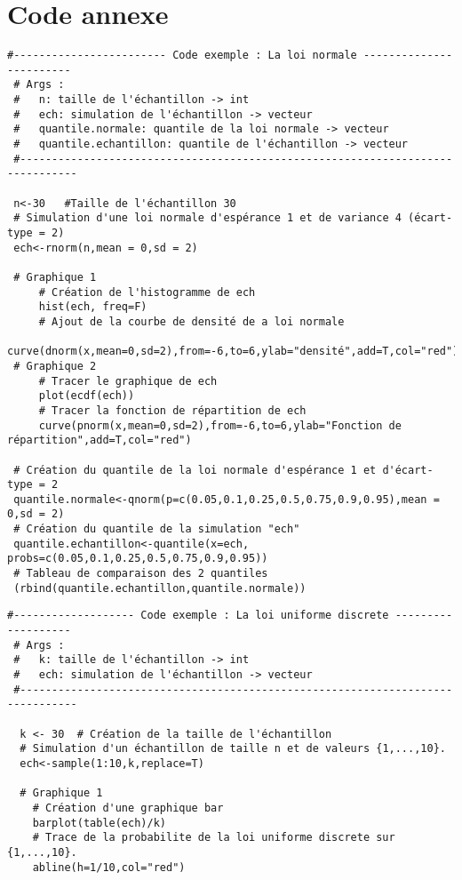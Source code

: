 \section*{Code annexe}

\begin{lstlisting}[caption=Code exemple : La loi normale, label=lst:normal_distribution]  
 #------------------------ Code exemple : La loi normale ------------------------
 # Args :
 #   n: taille de l'échantillon -> int
 #   ech: simulation de l'échantillon -> vecteur
 #   quantile.normale: quantile de la loi normale -> vecteur
 #   quantile.echantillon: quantile de l'échantillon -> vecteur
 #-------------------------------------------------------------------------------

 n<-30   #Taille de l'échantillon 30
 # Simulation d'une loi normale d'espérance 1 et de variance 4 (écart-type = 2)
 ech<-rnorm(n,mean = 0,sd = 2)

 # Graphique 1
     # Création de l'histogramme de ech
     hist(ech, freq=F)
     # Ajout de la courbe de densité de a loi normale
     curve(dnorm(x,mean=0,sd=2),from=-6,to=6,ylab="densité",add=T,col="red")
 # Graphique 2
     # Tracer le graphique de ech
     plot(ecdf(ech))
     # Tracer la fonction de répartition de ech
     curve(pnorm(x,mean=0,sd=2),from=-6,to=6,ylab="Fonction de répartition",add=T,col="red")

 # Création du quantile de la loi normale d'espérance 1 et d'écart-type = 2
 quantile.normale<-qnorm(p=c(0.05,0.1,0.25,0.5,0.75,0.9,0.95),mean = 0,sd = 2)
 # Création du quantile de la simulation "ech"
 quantile.echantillon<-quantile(x=ech, probs=c(0.05,0.1,0.25,0.5,0.75,0.9,0.95))
 # Tableau de comparaison des 2 quantiles
 (rbind(quantile.echantillon,quantile.normale))
\end{lstlisting}


\begin{lstlisting}[caption=Code exemple : Simulation de la loi uniforme discrète, label=lst:uniform_distribution]  
 #------------------- Code exemple : La loi uniforme discrete -------------------
 # Args :
 #   k: taille de l'échantillon -> int
 #   ech: simulation de l'échantillon -> vecteur
 #-------------------------------------------------------------------------------

  k <- 30  # Création de la taille de l'échantillon
  # Simulation d'un échantillon de taille n et de valeurs {1,...,10}.
  ech<-sample(1:10,k,replace=T)
  
  # Graphique 1
    # Création d'une graphique bar 
    barplot(table(ech)/k)
    # Trace de la probabilite de la loi uniforme discrete sur {1,...,10}.
    abline(h=1/10,col="red")
\end{lstlisting}



